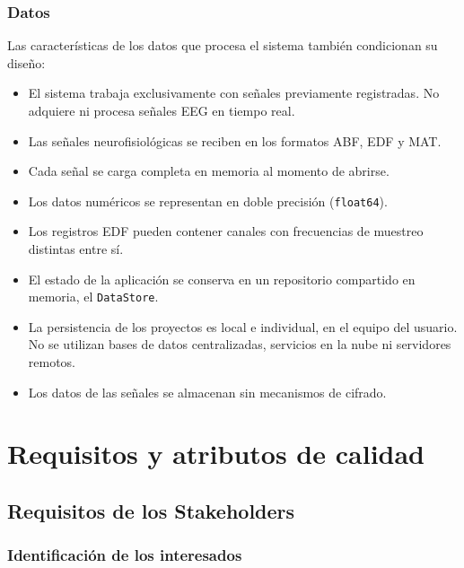 \documentclass[11pt,a4paper]{article}
\DeclareRobustCommand{\_}{\textunderscore\allowbreak}
\begin{document}
\subsubsection{Datos}
Las características de los datos que procesa el sistema también condicionan su diseño:
\begin{itemize}[nosep]
    \item El sistema trabaja exclusivamente con señales previamente registradas. No adquiere ni procesa señales EEG en tiempo real.
    \item Las señales neurofisiológicas se reciben en los formatos ABF, EDF y MAT.
    \item Cada señal se carga completa en memoria al momento de abrirse.
    \item Los datos numéricos se representan en doble precisión (\texttt{float64}).
    \item Los registros EDF pueden contener canales con frecuencias de muestreo distintas entre sí.
    \item El estado de la aplicación se conserva en un repositorio compartido en memoria, el \texttt{DataStore}.
    \item La persistencia de los proyectos es local e individual, en el equipo del usuario. No se utilizan bases de datos centralizadas, servicios en la nube ni servidores remotos.
    \item Los datos de las señales se almacenan sin mecanismos de cifrado.
\end{itemize}



\section{Requisitos y atributos de calidad}
\label{sec:requisitos_calidad}

\subsection{Requisitos de los Stakeholders}
\label{sec:stakeholders}

\subsubsection{Identificación de los interesados}
\end{document}
